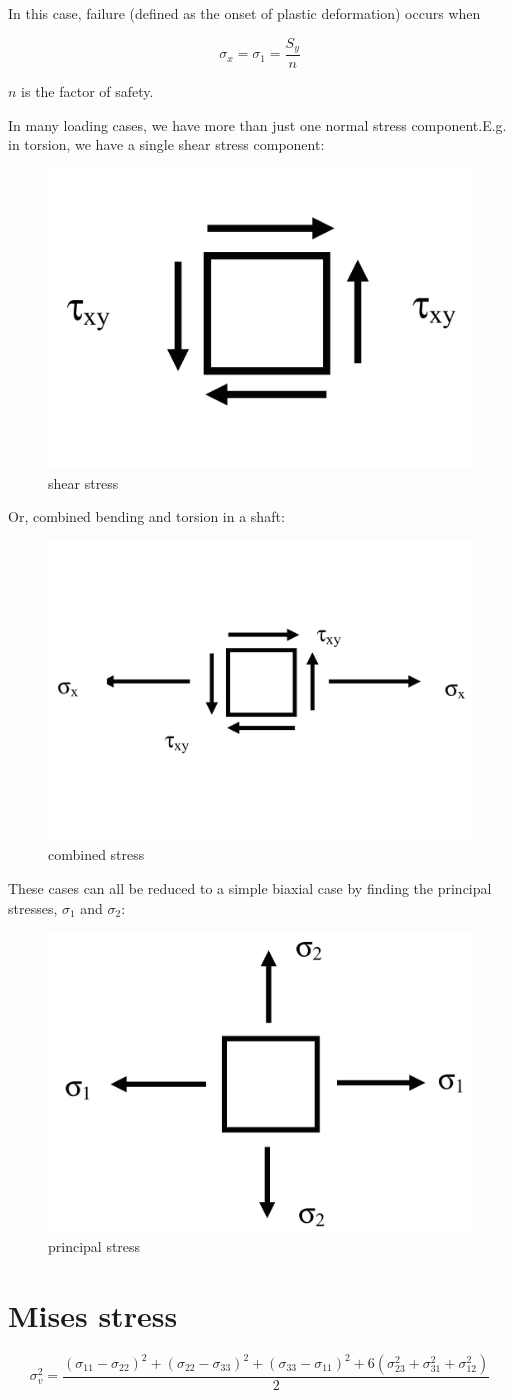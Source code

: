 In this case, failure (defined as the onset of plastic deformation) occurs when

\begin{equation}
\sigma_x = \sigma_1 = \frac{S_y}{n}
\end{equation}

$ n $ is the factor of safety.

In many loading cases, we have more than just one normal stress component.E.g. in torsion, we have a single shear stress component:

\begin{figure}[h!]
\centering
\includegraphics[width=0.3\linewidth]{figures/shear_stress}
\caption{shear stress}
\label{fig:shearstress}
\end{figure}

Or, combined bending and torsion in a shaft:

\begin{figure}[h!]
\centering
\includegraphics[width=0.3\linewidth]{figures/combined_stress}
\caption{combined stress}
\label{fig:combinedstress}
\end{figure}

These cases can all be reduced to a simple biaxial case by finding the principal stresses, $ \sigma_1 $ and $ \sigma_2 $:

\begin{figure}[h!]
\centering
\includegraphics[width=0.3\linewidth]{figures/principal_stress}
\caption{principal stress}
\label{fig:principalstress}
\end{figure}

\section{Mises stress}

\begin{equation}\label{key}
\sigma_v^2 = \dfrac{ \left( \sigma_{11}-\sigma_{22} \right)^2 + \left( \sigma_{22}-\sigma_{33} \right)^2 + \left( \sigma_{33}-\sigma_{11} \right)^2 + 6 \left( \sigma_{23}^2 + \sigma_{31}^2 + \sigma_{12}^2 \right)}{2}
\end{equation}